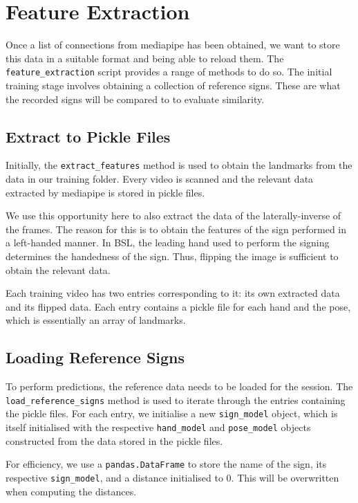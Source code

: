 \documentclass[final,rdr32.tex]{subfiles}
\begin{document}
\section{Feature Extraction}
\label{sec:feature}

Once a list of connections from mediapipe has been obtained, we want to store this data in a suitable format and being able to reload them. The \verb|feature_extraction| script provides a range of methods to do so. The initial training stage involves obtaining a collection of reference signs. These are what the recorded signs will be compared to to evaluate similarity.

\subsection{Extract to Pickle Files}

Initially, the \verb|extract_features| method is used to obtain the landmarks from the data in our training folder. Every video is scanned and the relevant data extracted by mediapipe is stored in pickle files.

We use this opportunity here to also extract the data of the laterally-inverse of the frames. The reason for this is to obtain the features of the sign performed in a left-handed manner. In BSL, the leading hand used to perform the signing determines the handedness of the sign. Thus, flipping the image is sufficient to obtain the relevant data.

Each training video has two entries corresponding to it: its own extracted data and its flipped data. Each entry contains a pickle file for each hand and the pose, which is essentially an array of landmarks.

\subsection{Loading Reference Signs}

To perform predictions, the reference data needs to be loaded for the session. The \verb|load_reference_signs| method is used to iterate through the entries containing the pickle files. For each entry, we initialise a new \verb|sign_model| object, which is itself initialised with the respective \verb|hand_model| and \verb|pose_model| objects constructed from the data stored in the pickle files.

For efficiency, we use a \verb|pandas.DataFrame| to store the name of the sign, its respective \verb|sign_model|, and a distance initialised to 0. This will be overwritten when computing the distances.
\end{document}
